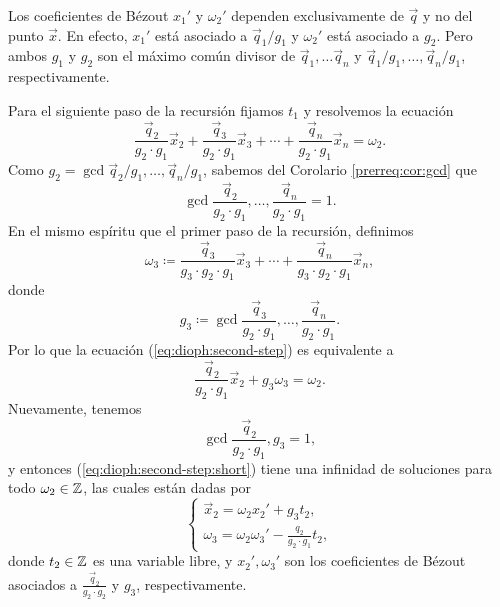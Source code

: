 \begin{observation}
	Los coeficientes de Bézout $x_1'$ y $\omega_2'$ dependen exclusivamente de $\vec{q}$ y no del
	punto $\vec{x}$. En efecto, $x_1'$ está asociado a $\vec{q}_1/g_1$ y $\omega_2'$ está asociado a
	$g_2$. Pero ambos $g_1$ y $g_2$ son el máximo común divisor de $\vec{q}_1, \ldots \vec{q}_n$ y
	$\vec{q}_1/g_1, \ldots, \vec{q}_n/g_1$, respectivamente. 
\end{observation}

Para el siguiente paso de la recursión fijamos $t_1$ y resolvemos la ecuación
\begin{equation}
	\label{eq:dioph:second-step}
	\frac{\vec{q}_2}{g_2 \cdot g_1}\vec{x}_2 +
	\frac{\vec{q}_3}{g_2 \cdot g_1}\vec{x}_3 +
	\cdots +
	\frac{\vec{q}_n}{g_2 \cdot g_1}\vec{x}_n
	= \omega_2.
\end{equation}
Como $g_2 = \gcd{\vec{q}_2/g_1, \ldots, \vec{q}_n/g_1}$, sabemos del Corolario \ref{prerreq:cor:gcd}
que
\begin{equation*}
	\gcd{\frac{\vec{q}_2}{g_2 \cdot g_1}, \ldots, \frac{\vec{q}_n}{g_2 \cdot g_1}} = 1.
\end{equation*}
En el mismo espíritu que el primer paso de la recursión, definimos
\begin{equation*}
	\omega_3 \coloneq \frac{\vec{q}_3}{g_3 \cdot g_2 \cdot g_1}\vec{x}_3 + \cdots + \frac{\vec{q}_n}{g_3
	\cdot g_2 \cdot g_1}\vec{x}_n,
\end{equation*}
donde
\begin{equation*}
	g_3 \coloneq  \gcd{\frac{\vec{q}_3}{g_2 \cdot g_1}, \ldots, \frac{\vec{q}_n}{g_2 \cdot g_1}}.
\end{equation*}
Por lo que la ecuación (\ref{eq:dioph:second-step}) es equivalente a
\begin{equation}
	\label{eq:dioph:second-step:short}
	\frac{\vec{q}_2}{g_2 \cdot g_1}\vec{x}_2 + g_3\omega_3 = \omega_2.
\end{equation}
Nuevamente, tenemos
\begin{equation*}
	\gcd{\frac{\vec{q}_2}{g_2 \cdot g_1}, g_3} = 1,
\end{equation*}
y entonces (\ref{eq:dioph:second-step:short}) tiene una infinidad de soluciones para todo $\omega_2 \in
\mathbb{Z}$, las cuales están dadas por
\begin{equation*}
	\begin{cases}
		\vec{x}_2 = \omega_2x_2' + g_3t_2, \\
		\omega_3 = \omega_2\omega_3' - \frac{q_2}{g_2 \cdot g_1}t_2,
	\end{cases}
\end{equation*}
donde $t_2 \in \mathbb{Z}$ es una variable libre, y $x_2', \omega_3'$ son los coeficientes de Bézout
asociados a $\frac{\vec{q}_2}{g_2 \cdot g_2}$ y $g_3$, respectivamente.

